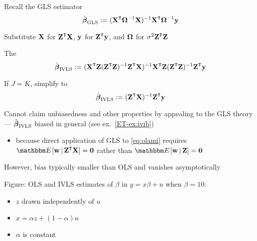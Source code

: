 \begin{frame}
    
    \vspace{2em}
    Recall the GLS estimator 
    \begin{equation*}
    \hboldbeta_{{\rm GLS}} 
    := (\boldX^\T \boldOmega^{-1} \boldX)^{-1} \boldX^\T \boldOmega^{-1} \boldy
    \end{equation*}

    Substitute $\mathbf X$ for $\boldZ^\T \boldX$, ${\mathbf y}$ for $\boldZ^\T
    \boldy$, and ${\boldsymbol \Omega}$ for $\sigma^2 \boldZ^\T \boldZ$
    
    \vspace{.7em}
    The
    \begin{equation*}
        \label{eq:ivls}
        \hboldbeta_{{\rm IVLS}} 
        := (\boldX^\T \boldZ (\boldZ^\T \boldZ)^{-1} \boldZ^\T \boldX)^{-1}
        \boldX^\T \boldZ (\boldZ^\T \boldZ)^{-1} \boldZ^\T \boldy
    \end{equation*}
    
    If $J = K$, simplify to 
    \begin{equation*}
        \label{eq:ivls2}
        \hboldbeta_{{\rm IVLS}} 
        := (\boldZ^\T \boldX)^{-1} \boldZ^\T \boldy
    \end{equation*}
        
\end{frame}

\begin{frame}

    \vspace{2em}
    Cannot claim unbiasedness and other properties by
    appealing to the GLS theory --- $\hat {\boldsymbol \beta}_{{\rm IVLS}}$
    biased in general (see ex.~\ref{ET-ex:ivib})
    \begin{itemize}
        \item because direct
        application of GLS to \eqref{eq:olami} requires  $\EE[ \boldw \given
        \boldZ^\T \boldX] = \boldzero$ rather than $\EE[ \boldw \given \boldZ] =
        \boldzero$
    \end{itemize}
    
    However, bias typically smaller than OLS and vanishes
    asymptotically 
    
    \vspace{.7em}
    Figure:  OLS and IVLS estimates of $\beta$ in
    $y = x \beta + u$ when $\beta=10$:
    
    \begin{itemize}
        \item $z$ drawn independently of $u$
        \item $x=\alpha z + (1 - \alpha) u$
        \item $\alpha$ is constant
    \end{itemize}
    
\end{frame}

